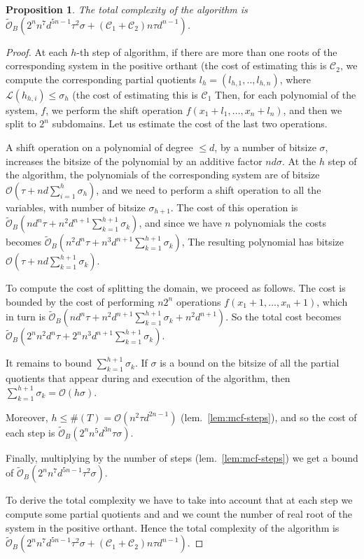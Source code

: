 \documentclass{sig-alternate}
\newtheorem{proposition}[theorem]{Proposition}
\newcommand{\dott}{{..}}
\newcommand{\OO}{\ensuremath{\mathcal{O}}\xspace}
\newcommand{\sOB}{\ensuremath{\widetilde{\mathcal{O}}_B}\xspace}
\newcommand{\bitsize}[1]{\ensuremath{\mathcal{L}\left( #1 \right)}\xspace}
\begin{document}
\begin{proposition}
  \label{prop:mcf-complexity}
  The total complexity of the algorithm is 
  $\sOB( 2^{n} n^7 d^{5n-1} \tau^2 \sigma + (\mathcal{C}_1 + \mathcal{C}_2) n \tau d^{n-1})$.  
\end{proposition}
\begin{proof}
  At each $h$-th step of algorithm, 
  if there are more than one roots of the corresponding system in the positive orthant
  (the cost of estimating this is $\mathcal{C}_2$,  
  we compute the corresponding partial quotients $l_h=(l_{h,1},\dott, l_{h,n})$,
  where $\bitsize{h_{h,i}} \leq \sigma_h$
  (the cost of estimating this is $\mathcal{C}_1$
  Then, for each polynomial of the system, $f$, we perform the shift operation
  $f( x_1 + l_1, \dots, x_n + l_n)$,
  and then we split to $2^n$ subdomains.
  Let us estimate the cost of the last two operations.

  A shift operation on a polynomial of degree $\leq d$, by a
  number of bitsize $\sigma$, increases the bitsize of the polynomial by an
  additive factor $n d \sigma$.
At the $h$ step of the algorithm, the polynomials of the corresponding system
  are of bitsize $\OO( \tau + n d \sum_{i=1}^{h}{\sigma_h})$, and we need to
  perform a shift operation to all the variables, with number of bitsize
  $\sigma_{h+1}$.
  The cost of this operation is $\sOB( n d^n \tau + n^2 d^{n+1} \sum_{k=1}^{h+1}{\sigma_k})$,
  and since we have $n$ polynomials the costs becomes 
  $\sOB( n^2 d^n \tau + n^3 d^{n+1} \sum_{k=1}^{h+1}{\sigma_k})$,
  The resulting polynomial has bitsize $\OO( \tau + n d \sum_{k=1}^{h+1}{\sigma_k})$.
  
  To compute the cost of splitting the domain, we proceed as follows.
  The cost is bounded by the cost of performing $n 2^n$ operations $f(x_1 + 1, \dots, x_n + 1)$,
  which in turn is  
  $\sOB(n d^n \tau + n^2 d^{n+1} \sum_{k=1}^{h+1}{\sigma_k} + n^2 d^{n+1})$.
  So the total cost becomes
  $\sOB(2^{n} n^2 d^{n} \tau + 2^{n} n^3 d^{n+1} \sum_{k=1}^{h+1}{\sigma_k})$.

  
  It remains to bound $\sum_{k=1}^{h+1}{\sigma_k}$.
  If $\sigma$ is a bound on the bitsize of all the partial quotients that appear
  during and execution of the algorithm, then 
  $\sum_{k=1}^{h+1}{\sigma_k} = \OO( h \sigma)$.

Moreover, $h \leq \#(T)  = \OO( n^2 \tau d^{2n-1})$ (lem.~\ref{lem:mcf-steps}),
  and so the cost of each step is
$\sOB(2^{n} n^5 d^{3n} \tau \sigma)$.
  
  Finally, multiplying by the number of steps (lem.~\ref{lem:mcf-steps})
  we get a bound of $\sOB( 2^{n} n^7 d^{5n-1} \tau^2 \sigma)$.  

  To derive the total complexity we have to take into account that at each step
  we compute some partial quotients and  and we count the number of real root of
  the system in the positive orthant.
  Hence the total complexity of the algorithm is 
  $\sOB( 2^{n} n^7 d^{5n-1} \tau^2 \sigma + (\mathcal{C}_1 + \mathcal{C}_2) n \tau d^{n-1})$.  
\end{proof}
\end{document}
